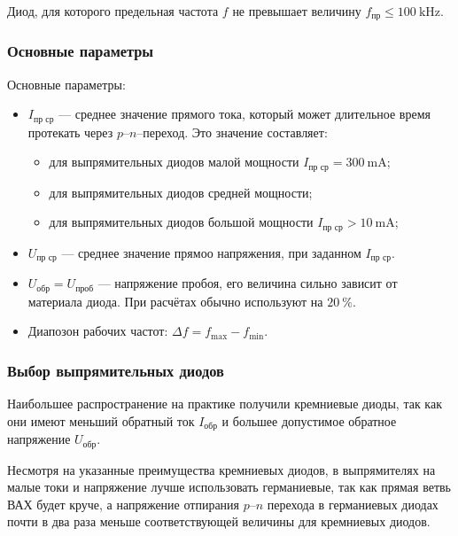 \begin{definition}
	Диод, для которого предельная частота $f$ не превышает величину $f_\text{пр}
		\leq \qty{100}{\kilo\hertz}$.
\end{definition}

\subsubsection{Основные параметры}
Основные параметры:
\begin{itemize}
	\item $I_\text{пр ср}$ --- среднее значение прямого тока, который может
	      длительное время протекать через $p$--$n$--переход. Это значение составляет:
	      \begin{itemize}
		      \item для выпрямительных диодов малой мощности $I_\text{пр ср} =
			            \qty{300}{\milli\ampere}$;
		      \item для выпрямительных диодов средней мощности;
		      \item для выпрямительных диодов большой мощности $I_\text{пр ср} >
			            \qty{10}{\milli\ampere}$;
	      \end{itemize}
	\item $U_\text{пр ср}$ --- среднее значение прямоо напряжения, при
	      заданном $I_\text{пр ср}$.
	\item $U_\text{обр} = U_\text{проб}$ --- напряжение пробоя, его величина
	      сильно зависит от материала диода. При расчётах обычно используют на
	      $\qty{20}{\percent}$.
	\item Диапозон рабочих частот: $\Delta f = f_{\max} - f_{\min}$.
\end{itemize}

\subsubsection{Выбор выпрямительных диодов}

Наибольшее распространение на практике получили кремниевые диоды, так как они
имеют меньший обратный ток $I_\text{обр}$ и большее допустимое обратное
напряжение $U_\text{обр}$.

Несмотря на указанные преимущества кремниевых диодов, в выпрямителях на малые
токи и напряжение лучше использовать германиевые, так как прямая ветвь ВАХ будет
круче, а напряжение отпирания $p$--$n$ перехода в германиевых диодах почти в два
раза меньше соответствующей величины для кремниевых диодов.


